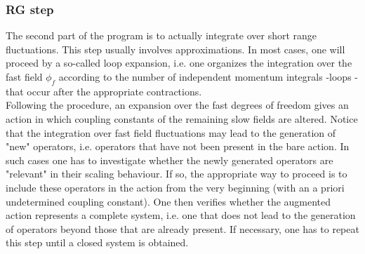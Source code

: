 \documentclass[cyan]{elegantnote}
\begin{document}
\subsubsection{RG step}
The second part of the program is to actually integrate over short range fluctuations. This step usually involves approximations. 
In most cases, one will proceed by a so-called loop expansion, i.e. one organizes the integration over the fast field $\phi_f$ according to the number of independent momentum integrals -loops - that occur after the appropriate contractions.
\\
Following the procedure, an expansion over the fast degrees of freedom gives an action in which coupling constants of the remaining slow fields are altered. 
Notice that the integration over fast field fluctuations may  lead to the generation of "new" operators, i.e. operators that have not been present in the bare action. In such cases one has to investigate whether the newly generated operators are "relevant" in their scaling behaviour. 
If so, the appropriate way to proceed is to include these operators in the action from the very beginning (with an a priori undetermined coupling constant). One then verifies whether the augmented action represents a complete system, i.e. one that does not lead to the generation of operators beyond those that are already present. If necessary, one has to repeat this step until a closed system is obtained.
\end{document}
